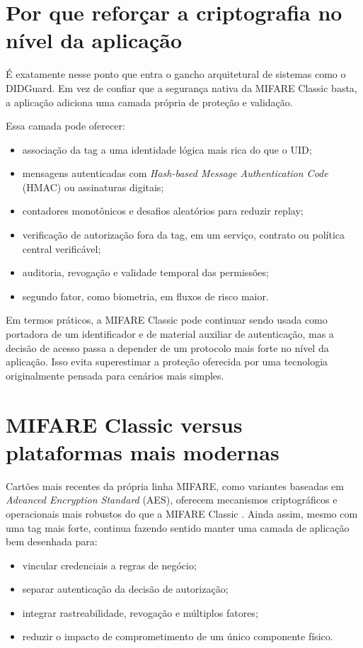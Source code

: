 \section{Por que reforçar a criptografia no nível da aplicação}
É exatamente nesse ponto que entra o gancho arquitetural de sistemas como o DIDGuard. Em vez de confiar que a segurança nativa da MIFARE Classic basta, a aplicação adiciona uma camada própria de proteção e validação.

Essa camada pode oferecer:
\begin{itemize}[leftmargin=*]
  \item associação da tag a uma identidade lógica mais rica do que o UID;
  \item mensagens autenticadas com \textit{Hash-based Message Authentication Code} (HMAC) ou assinaturas digitais;
  \item contadores monotônicos e desafios aleatórios para reduzir replay;
  \item verificação de autorização fora da tag, em um serviço, contrato ou política central verificável;
  \item auditoria, revogação e validade temporal das permissões;
  \item segundo fator, como biometria, em fluxos de risco maior.
\end{itemize}

Em termos práticos, a MIFARE Classic pode continuar sendo usada como portadora de um identificador e de material auxiliar de autenticação, mas a decisão de acesso passa a depender de um protocolo mais forte no nível da aplicação. Isso evita superestimar a proteção oferecida por uma tecnologia originalmente pensada para cenários mais simples.

\section{MIFARE Classic versus plataformas mais modernas}
Cartões mais recentes da própria linha MIFARE, como variantes baseadas em \textit{Advanced Encryption Standard} (AES), oferecem mecanismos criptográficos e operacionais mais robustos do que a MIFARE Classic \citep{nxp_mifare_plus_ev2}. Ainda assim, mesmo com uma tag mais forte, continua fazendo sentido manter uma camada de aplicação bem desenhada para:
\begin{itemize}[leftmargin=*]
  \item vincular credenciais a regras de negócio;
  \item separar autenticação da decisão de autorização;
  \item integrar rastreabilidade, revogação e múltiplos fatores;
  \item reduzir o impacto de comprometimento de um único componente físico.
\end{itemize}

